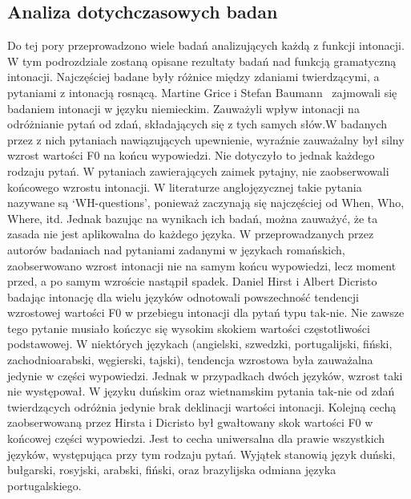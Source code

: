 \documentclass[a4paper,12 pt]{article}
\begin{document}
 

\subsection{Analiza dotychczasowych badan}
Do tej pory przeprowadzono wiele badań analizujących każdą z funkcji intonacji. W tym podrozdziale zostaną opisane rezultaty badań nad funkcją gramatyczną intonacji. Najczęściej badane były różnice między zdaniami twierdzącymi, a pytaniami z intonacją rosnącą.
\leavevmode
\newline
Martine Grice i Stefan Baumann~\cite{GRI-BA} zajmowali się badaniem intonacji w języku niemieckim. Zauważyli wpływ intonacji na odróżnianie pytań od zdań, składających się z tych samych słów.W badanych przez z nich pytaniach nawiązujących upewnienie, wyraźnie zauważalny był silny wzrost wartości F0 na końcu wypowiedzi. Nie dotyczyło to jednak każdego rodzaju pytań. W pytaniach zawierających zaimek pytajny, nie zaobserwowali końcowego wzrostu intonacji. W literaturze anglojęzycznej takie pytania nazywane są `WH-questions', ponieważ zaczynają się najczęściej od When, Who, Where, itd. Jednak bazując na wynikach ich badań, można zauważyć, że ta zasada nie jest aplikowalna do każdego języka. W przeprowadzanych przez autorów badaniach nad pytaniami zadanymi w językach romańskich, zaobserwowano wzrost intonacji nie na samym końcu wypowiedzi, lecz moment przed, a po samym wzroście nastąpił spadek.
\leavevmode
\newline
Daniel Hirst i Albert Dicristo~\cite{INT-SYS} badając intonację dla wielu języków odnotowali powszechność tendencji wzrostowej wartości F0 w przebiegu intonacji dla pytań typu tak-nie. Nie zawsze tego pytanie musiało kończyc się wysokim skokiem wartości częstotliwości podstawowej. W niektórych językach (angielski, szwedzki, portugalijski, fiński, zachodnioarabski, węgierski, tajski), tendencja wzrostowa była zauważalna jedynie w części wypowiedzi.
Jednak w przypadkach dwóch języków, wzrost taki nie występował. W języku duńskim oraz wietnamskim pytania tak-nie od zdań twierdzących odróżnia jedynie brak deklinacji wartości intonacji.
\newline Kolejną cechą zaobserwowaną przez Hirsta i Dicristo był gwałtowany skok wartości F0 w końcowej części wypowiedzi. Jest to cecha uniwersalna dla prawie wszystkich języków, występująca przy tym rodzaju pytań. Wyjątek stanowią język duński, bułgarski, rosyjski, arabski, fiński, oraz brazylijska odmiana języka portugalskiego.
\leavevmode
\newline
\end{document}
